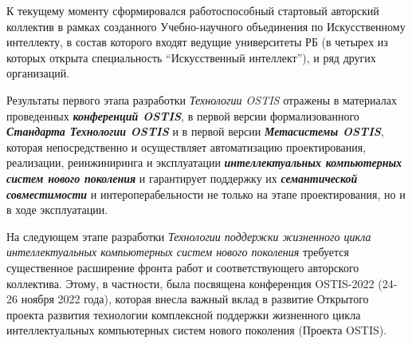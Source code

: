 К текущему моменту сформировался работоспособный стартовый авторский коллектив в рамках созданного Учебно-научного объединения по Искусственному интеллекту, в состав которого входят ведущие университеты РБ (в четырех из которых открыта специальность ``Искусственный интеллект''), и ряд других организаций.

Результаты первого этапа разработки \textit{Технологии OSTIS} отражены в материалах проведенных \textbf{\textit{конференций OSTIS}}, в первой версии формализованного \textbf{\textit{Стандарта Технологии OSTIS}} и в первой версии \textbf{\textit{Метасистемы OSTIS}}, которая непосредственно и осуществляет автоматизацию проектирования, реализации, реинжиниринга и эксплуатации \textbf{\textit{интеллектуальных компьютерных систем нового поколения}} и гарантирует поддержку их \textbf{\textit{семантической совместимости}} и интероперабельности не только на этапе проектирования, но и в ходе эксплуатации.

На следующем этапе разработки \textit{Технологии поддержки жизненного цикла интеллектуальных компьютерных систем нового поколения} требуется существенное расширение фронта работ и соответствующего авторского коллектива. Этому, в частности, была посвящена конференция OSTIS-2022 (24-26 ноября 2022 года), которая внесла важный вклад в развитие Открытого проекта развития технологии комплексной поддержки жизненного цикла интеллектуальных компьютерных систем нового поколения (Проекта OSTIS).